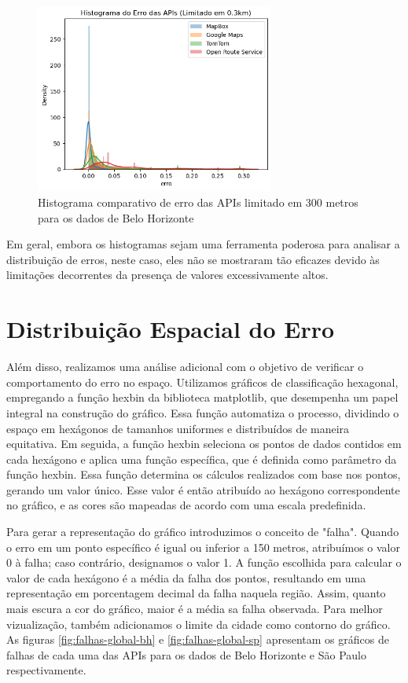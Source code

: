 \begin{figure}[h]
  \centering
  \includegraphics[width=0.7\textwidth]{Figuras/histLimitadoBH.png}
  \caption{Histograma comparativo de erro das APIs limitado em 300 metros para os dados de Belo Horizonte}
  \label{fig:histLimitadoBH}
\end{figure}

Em geral, embora os histogramas sejam uma ferramenta poderosa para analisar a distribuição de erros, neste caso, eles não se mostraram tão eficazes devido às limitações decorrentes da presença de valores excessivamente altos.

\section{Distribuição Espacial do Erro}

Além disso, realizamos uma análise adicional com o objetivo de verificar o comportamento do erro no espaço. Utilizamos gráficos de classificação hexagonal, empregando a função hexbin da biblioteca matplotlib, que desempenha um papel integral na construção do gráfico. Essa função automatiza o processo, dividindo o espaço em hexágonos de tamanhos uniformes e distribuídos de maneira equitativa. Em seguida, a função hexbin seleciona os pontos de dados contidos em cada hexágono e aplica uma função específica, que é definida como parâmetro da função hexbin. Essa função determina os cálculos realizados com base nos pontos, gerando um valor único. Esse valor é então atribuído ao hexágono correspondente no gráfico, e as cores são mapeadas de acordo com uma escala predefinida.

Para gerar a representação do gráfico introduzimos o conceito de "falha". Quando o erro em um ponto específico é igual ou inferior a 150 metros, atribuímos o valor 0 à falha; caso contrário, designamos o valor 1. A função escolhida para calcular o valor de cada hexágono é a média da falha dos pontos, resultando em uma representação em porcentagem decimal da falha naquela região. Assim, quanto mais escura a cor do gráfico, maior é a média sa falha observada. Para melhor vizualização, também adicionamos o limite da cidade como contorno do gráfico. As figuras \ref{fig:falhas-global-bh} e \ref{fig:falhas-global-sp} apresentam os gráficos de falhas de cada uma das APIs para os dados de Belo Horizonte e São Paulo respectivamente. 


